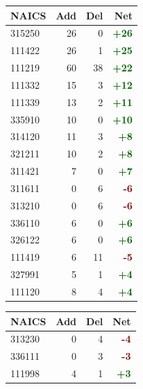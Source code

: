 \documentclass[11pt]{article}
\begin{document}
\begin{table}[H]
\centering
\begin{minipage}{0.48\textwidth}
\centering
{}
\begin{tabular}{lrrr}
\toprule
\textbf{NAICS} & \textbf{Add} & \textbf{Del} & \textbf{Net} \\
\midrule
315250 & 26 & 0 & \textcolor{darkgreen}{\textbf{+26}} \\
111422 & 26 & 1 & \textcolor{darkgreen}{\textbf{+25}} \\
111219 & 60 & 38 & \textcolor{darkgreen}{\textbf{+22}} \\
111332 & 15 & 3 & \textcolor{darkgreen}{\textbf{+12}} \\
111339 & 13 & 2 & \textcolor{darkgreen}{\textbf{+11}} \\
335910 & 10 & 0 & \textcolor{darkgreen}{\textbf{+10}} \\
314120 & 11 & 3 & \textcolor{darkgreen}{\textbf{+8}} \\
321211 & 10 & 2 & \textcolor{darkgreen}{\textbf{+8}} \\
311421 & 7 & 0 & \textcolor{darkgreen}{\textbf{+7}} \\
311611 & 0 & 6 & \textcolor{darkred}{\textbf{-6}} \\
313210 & 0 & 6 & \textcolor{darkred}{\textbf{-6}} \\
336110 & 6 & 0 & \textcolor{darkgreen}{\textbf{+6}} \\
326122 & 6 & 0 & \textcolor{darkgreen}{\textbf{+6}} \\
111419 & 6 & 11 & \textcolor{darkred}{\textbf{-5}} \\
327991 & 5 & 1 & \textcolor{darkgreen}{\textbf{+4}} \\
111120 & 8 & 4 & \textcolor{darkgreen}{\textbf{+4}} \\
\bottomrule
\end{tabular}
\end{minipage}
\hfill
\begin{minipage}{0.48\textwidth}
\centering
{}
\begin{tabular}{lrrr}
\toprule
\textbf{NAICS} & \textbf{Add} & \textbf{Del} & \textbf{Net} \\
\midrule
313230 & 0 & 4 & \textcolor{darkred}{\textbf{-4}} \\
336111 & 0 & 3 & \textcolor{darkred}{\textbf{-3}} \\
111998 & 4 & 1 & \textcolor{darkgreen}{\textbf{+3}} \\

\end{tabular}
\end{minipage}
\end{table}
\end{document}
